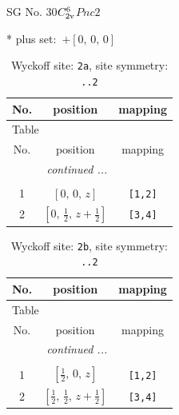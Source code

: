 \documentclass[fleqn,8pt]{jsarticle}
\begin{document}
\setcounter{MaxMatrixCols}{32}

\renewcommand{\tablename}{Table~}
\renewcommand{\figurename}{Figure~}
\begin{center}
\LARGE
SG No. 30\quad$C_{\rm 2v}^{6}$\quad$Pnc2$\quad[ orthorhombic ]
\end{center}
* plus set:\,\,\,$+\left[ 0,\, 0,\, 0 \right]$
\renewcommand{\arraystretch}{1.2}
\begin{longtable}{ccc}
\caption{Wyckoff site: {\tt 2a}, site symmetry: {\tt ..2}}
 \\
 \hline \hline
No. & position & mapping \\ \hline \endfirsthead

\multicolumn{2}{l}{\tablename\ \thetable{}} \\
 \hline \hline
No. & position & mapping \\ \hline \endhead

 \hline \hline
\multicolumn{2}{r}{\footnotesize\it continued ...} \\ \endfoot

 \hline \hline
\multicolumn{2}{r}{} \\ \endlastfoot

1 & $\left[ 0,\, 0,\, z \right]$ & {\tt [1,2]} \\ \hline
2 & $\left[ 0,\, \frac{1}{2},\, z + \frac{1}{2} \right]$ & {\tt [3,4]} \\
\end{longtable}
\renewcommand{\arraystretch}{1.2}
\begin{longtable}{ccc}
\caption{Wyckoff site: {\tt 2b}, site symmetry: {\tt ..2}}
 \\
 \hline \hline
No. & position & mapping \\ \hline \endfirsthead

\multicolumn{2}{l}{\tablename\ \thetable{}} \\
 \hline \hline
No. & position & mapping \\ \hline \endhead

 \hline \hline
\multicolumn{2}{r}{\footnotesize\it continued ...} \\ \endfoot

 \hline \hline
\multicolumn{2}{r}{} \\ \endlastfoot

1 & $\left[ \frac{1}{2},\, 0,\, z \right]$ & {\tt [1,2]} \\ \hline
2 & $\left[ \frac{1}{2},\, \frac{1}{2},\, z + \frac{1}{2} \right]$ & {\tt [3,4]} \\
\end{longtable}
\end{document}
